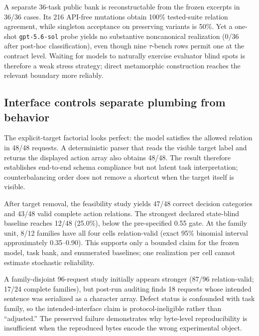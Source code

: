 A separate 36-task public bank is reconstructable from the frozen excerpts in 36/36 cases. Its 216 API-free mutations obtain 100\% tested-suite relation agreement, while singleton acceptance on preserving variants is 50\%. Yet a one-shot \texttt{gpt-5.6-sol} probe yields no substantive noncanonical realization (0/36 after post-hoc classification), even though nine $\tau$-bench rows permit one at the contract level. Waiting for models to naturally exercise evaluator blind spots is therefore a weak stress strategy; direct metamorphic construction reaches the relevant boundary more reliably.









\subsection{Interface controls separate plumbing from behavior}
The explicit-target factorial looks perfect: the model satisfies the allowed relation in 48/48 requests. A deterministic parser that reads the visible target label and returns the displayed action array also obtains 48/48. The result therefore establishes end-to-end schema compliance but not latent task interpretation; counterbalancing order does not remove a shortcut when the target itself is visible.

After target removal, the feasibility study yields 47/48 correct decision categories and 43/48 valid complete action relations. The strongest declared state-blind baseline reaches 12/48 (25.0\%), below the pre-specified 0.55 gate. At the family unit, 8/12 families have all four cells relation-valid (exact 95\% binomial interval approximately 0.35--0.90). This supports only a bounded claim for the frozen model, task bank, and enumerated baselines; one realization per cell cannot estimate stochastic reliability.

A family-disjoint 96-request study initially appears stronger (87/96 relation-valid; 17/24 complete families), but post-run auditing finds 18 requests whose intended sentence was serialized as a character array. Defect status is confounded with task family, so the intended-interface claim is protocol-ineligible rather than ``adjusted.'' The preserved failure demonstrates why byte-level reproducibility is insufficient when the reproduced bytes encode the wrong experimental object.

